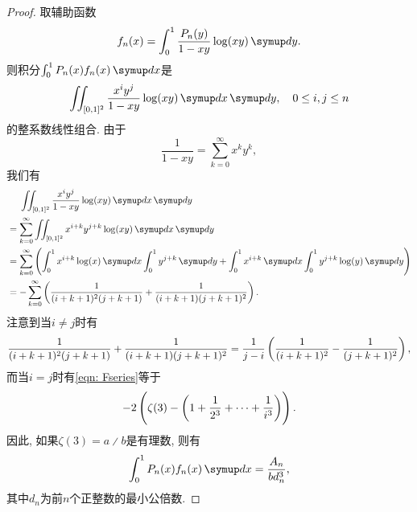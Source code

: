 \begin{proof}
    取辅助函数
    \begin{equation}
        f_n(x) = \int_0^1 \frac{P_n(y)}{1-xy}\log(xy)\diff y.
    \end{equation}
    则积分$\int_0^1 P_n(x)f_n(x)\diff x$是
    \begin{equation}
        \iint_{[0, 1]^2}\frac{x^iy^j}{1-xy}\log(xy)\diff x\diff y,\quad 0\leq i, j\leq n
    \end{equation}
    的整系数线性组合. 由于
    \begin{equation}
        \frac{1}{1-xy}=\sum_{k=0}^{\infty}x^ky^k,
    \end{equation}
    我们有
    \begin{align}
        &{\phantom{{}={}}}\iint_{[0, 1]^2}\frac{x^iy^j}{1-xy}\log(xy)\diff x\diff y\label{eqn: Fseries}\\
        &= \sum_{k=0}^\infty \iint_{[0, 1]^2} x^{i+k}y^{j+k}\log(xy)\diff x\diff y\\
        &= \sum_{k=0}^\infty\lr(){\int_0^1 x^{i+k}\log(x)\diff x\int_0^1 y^{j+k}\diff y + \int_0^1 x^{i+k}\diff x\int_0^1 y^{j+k}\log(y)\diff y}\\
        &= -\sum_{k=0}^\infty\lr(){\frac{1}{(i+k+1)^2(j+k+1)}+\frac{1}{(i+k+1)(j+k+1)^2}}.
    \end{align}
    注意到当$i\neq j$时有
    \begin{equation}
        \frac{1}{(i+k+1)^2(j+k+1)}+\frac{1}{(i+k+1)(j+k+1)^2} = \frac{1}{j-i}\lr(){\frac{1}{(i+k+1)^2}-\frac{1}{(j+k+1)^2}},
    \end{equation}
    而当$i=j$时有\ref{eqn: Fseries}等于
    \begin{equation}
        -2\lr(){\zeta(3)-\lr(){1+\frac{1}{2^3}+\dotsb + \frac{1}{i^3}}}.
    \end{equation}
    因此, 如果$\zeta(3)=a\divslash b$是有理数, 则有
    \begin{equation}
        \int_0^1P_n(x)f_n(x)\diff x = \frac{A_n}{bd_n^3},
    \end{equation}
    其中$d_n$为前$n$个正整数的最小公倍数.


\end{proof}
